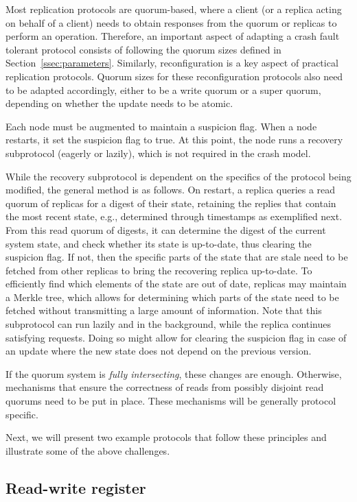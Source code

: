 Most replication protocols are quorum-based, where a client (or a
replica acting on behalf of a client) needs to obtain responses
from the quorum or replicas to perform an operation.  Therefore,
an important aspect of adapting a crash fault tolerant protocol
consists of following the quorum sizes defined in
Section~\ref{ssec:parameters}. Similarly, reconfiguration is a
key aspect of practical replication protocols. Quorum sizes for
these reconfiguration protocols also need to be adapted
accordingly, either to be a write quorum or a super quorum,
depending on whether the update needs to be atomic.

Each node must be augmented to maintain a suspicion flag. When a node
restarts, it set the suspicion flag to true. At this point, the node
runs a recovery subprotocol (eagerly or lazily), which is not required
in the crash model.

While the recovery subprotocol is dependent on the specifics of
the protocol being modified, the general method is as follows. On
restart, a replica queries a read quorum of replicas for a digest
of their state, retaining the replies that contain the most
recent state, e.g., determined through timestamps as exemplified
next.  From this read quorum of digests, it can determine the
digest of the current system state, and check whether its state
is up-to-date, thus clearing the suspicion flag. If not, then the
specific parts of the state that are stale need to be fetched
from other replicas to bring the recovering replica up-to-date.
To efficiently find which elements of the state are out of date,
replicas may maintain a Merkle tree, which allows for determining
which parts of the state need to be fetched without transmitting
a large amount of information. Note that this subprotocol can run
lazily and in the background, while the replica continues
satisfying requests. Doing so might allow for clearing the
suspicion flag in case of an update where the new state does not
depend on the previous version.

If the quorum system is \emph{fully intersecting}, these changes
are enough. Otherwise, mechanisms that ensure the correctness of
reads from possibly disjoint read quorums need to be put in
place. These mechanisms will be generally protocol specific.


Next, we will present two example protocols that follow these
principles and illustrate some of the above challenges.

\subsection{Read-write register}\label{ssec:abd}

